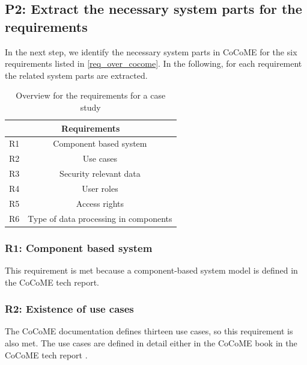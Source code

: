 \subsection{P2: Extract the necessary system parts for the requirements}
\label{reqCoCoME}
In the next step, we identify the necessary system parts in CoCoME for the six requirements listed in \autoref{req_over_cocome}. In the following, for each requirement the related system parts are extracted. 
\begin{table}
\begin{tabular}{|c|c|}
\hline 
\multicolumn{2}{|c|}{Requirements} \\ 
\hline 
R1 & Component based system \\ 
\hline 
R2 & Use cases \\ 
\hline 
R3 & Security relevant data \\ 
\hline 
R4 & User roles \\ 
\hline 
R5 & Access rights \\ 
\hline 
R6 & Type of data processing in components \\ 
\hline 
\end{tabular} 
\caption{Overview for the requirements for a case study}
\label{req_over_cocome}
\end{table}

\subsubsection{R1: Component based system}
This requirement is met because a component-based system model is defined in the CoCoME tech report\cite{CoCoMETechReport}.
\subsubsection{R2: Existence of use cases}
\label{req_uc}
The CoCoME documentation defines thirteen use cases, so this requirement is also met. The use cases are defined in detail either in the CoCoME book \cite{CoCoMEBook} in the CoCoME tech report \cite{CoCoMETechReport}. 
